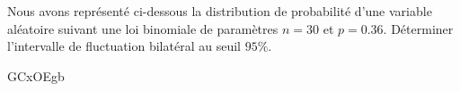
\begin{exercice}\label{exosmath-0384}

Nous avons représenté ci-dessous la distribution de probabilité d'une variable aléatoire suivant une loi binomiale de paramètres \( n=30\) et \( p=0.36\). Déterminer l'intervalle de fluctuation bilatéral au seuil \( 95\%\).

GCxOEgb

\end{exercice}
